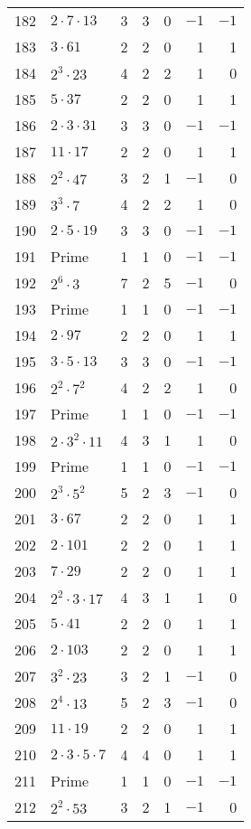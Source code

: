 \documentclass[12pt]{article}
\begin{document}
\begin{tabular}{|r|l|r|r|r|r|r|}
182 & $2 \cdot 7 \cdot 13$ & 3 & 3 & 0 & $-1$ & $-1$ \\
183 & $3 \cdot 61$ & 2 & 2 & 0 & 1 & 1 \\
184 & $2^3 \cdot 23$ & 4 & 2 & 2 & 1 & 0 \\
185 & $5 \cdot 37$ & 2 & 2 & 0 & 1 & 1 \\
186 & $2 \cdot 3 \cdot 31$ & 3 & 3 & 0 & $-1$ & $-1$ \\
187 & $11 \cdot 17$ & 2 & 2 & 0 & 1 & 1 \\
188 & $2^2 \cdot 47$ & 3 & 2 & 1 & $-1$ & 0 \\
189 & $3^3 \cdot 7$ & 4 & 2 & 2 & 1 & 0 \\
190 & $2 \cdot 5 \cdot 19$ & 3 & 3 & 0 & $-1$ & $-1$ \\
191 & Prime & 1 & 1 & 0 & $-1$ & $-1$ \\
192 & $2^6 \cdot 3$ & 7 & 2 & 5 & $-1$ & 0 \\
193 & Prime & 1 & 1 & 0 & $-1$ & $-1$ \\
194 & $2 \cdot 97$ & 2 & 2 & 0 & 1 & 1 \\
195 & $3 \cdot 5 \cdot 13$ & 3 & 3 & 0 & $-1$ & $-1$ \\
196 & $2^2 \cdot 7^2$ & 4 & 2 & 2 & 1 & 0 \\
197 & Prime & 1 & 1 & 0 & $-1$ & $-1$ \\
198 & $2 \cdot 3^2 \cdot 11$ & 4 & 3 & 1 & 1 & 0 \\
199 & Prime & 1 & 1 & 0 & $-1$ & $-1$ \\
200 & $2^3 \cdot 5^2$ & 5 & 2 & 3 & $-1$ & 0 \\
201 & $3 \cdot 67$ & 2 & 2 & 0 & 1 & 1 \\
202 & $2 \cdot 101$ & 2 & 2 & 0 & 1 & 1 \\
203 & $7 \cdot 29$ & 2 & 2 & 0 & 1 & 1 \\
204 & $2^2 \cdot 3 \cdot 17$ & 4 & 3 & 1 & 1 & 0 \\
205 & $5 \cdot 41$ & 2 & 2 & 0 & 1 & 1 \\
206 & $2 \cdot 103$ & 2 & 2 & 0 & 1 & 1 \\
207 & $3^2 \cdot 23$ & 3 & 2 & 1 & $-1$ & 0 \\
208 & $2^4 \cdot 13$ & 5 & 2 & 3 & $-1$ & 0 \\
209 & $11 \cdot 19$ & 2 & 2 & 0 & 1 & 1 \\
210 & $2 \cdot 3 \cdot 5 \cdot 7$ & 4 & 4 & 0 & 1 & 1 \\
211 & Prime & 1 & 1 & 0 & $-1$ & $-1$ \\
212 & $2^2 \cdot 53$ & 3 & 2 & 1 & $-1$ & 0 \\

\end{tabular}
\end{document}

